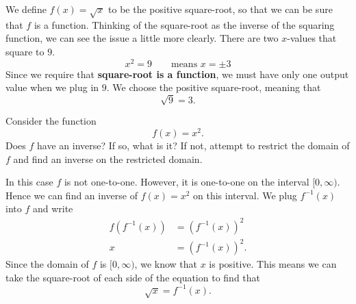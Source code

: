 \documentclass{ximera}
\begin{document}
\begin{warning}
  We define $f(x) = \sqrt{x}$ to be the positive square-root, so that
  we can be sure that $f$ is a function. Thinking of the square-root
  as the inverse of the squaring function, we can see the issue a
  little more clearly.  There are two $x$-values that square to $9$.
  \[
  x^2 = 9\qquad\text{means $x=\pm 3$}
  \]
  Since we require that \textbf{square-root is a function}, we must
  have only one output value when we plug in $9$.  We choose the
  positive square-root, meaning that
  \[
  \sqrt{9}  =3.
  \]
\end{warning}


\begin{example}
  Consider the function
  \[
  f(x) = x^2.
  \]
  Does $f$ have an inverse? If so, what is it? If not, attempt to
  restrict the domain of $f$ and find an inverse on the restricted
  domain.
  \begin{explanation}
    In this case $f$ is not one-to-one. However, it is one-to-one on the
    interval $[0,\infty)$. Hence we can find an inverse of $f(x)=x^2$ on
      this interval. We plug $f^{-1}(x)$ into $f$ and write
      \begin{align*}
        f(f^{-1}(x)) &= \left(f^{-1}(x)\right)^2\\
        x &= \left(f^{-1}(x)\right)^2.
      \end{align*}
      Since the domain of $f$ is $[0, \infty)$, we know that $x$ is
        positive.  This means we can take the square-root of each side
        of the equation to find that
        \[
        \sqrt{x} = f^{-1}(x).
        \]
        \begin{image}
\end{image}
\end{explanation}
\end{example}
\end{document}
